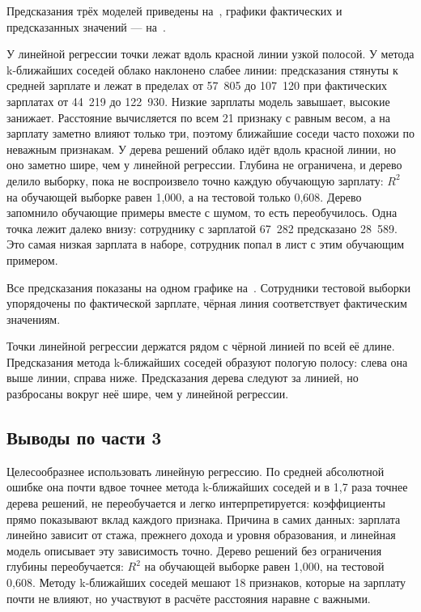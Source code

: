 \documentclass[a4paper,14pt]{extarticle}
\begin{document}
Предсказания трёх моделей приведены на~, графики фактических и предсказанных значений — на~.



У линейной регрессии точки лежат вдоль красной линии узкой полосой. У метода k-ближайших соседей облако наклонено слабее линии: предсказания стянуты к средней зарплате и лежат в пределах от 57~805 до 107~120 при фактических зарплатах от 44~219 до 122~930. Низкие зарплаты модель завышает, высокие занижает. Расстояние вычисляется по всем 21 признаку с равным весом, а на зарплату заметно влияют только три, поэтому ближайшие соседи часто похожи по неважным признакам. У дерева решений облако идёт вдоль красной линии, но оно заметно шире, чем у линейной регрессии. Глубина не ограничена, и дерево делило выборку, пока не воспроизвело точно каждую обучающую зарплату: $R^2$ на обучающей выборке равен 1,000, а на тестовой только 0,608. Дерево запомнило обучающие примеры вместе с шумом, то есть переобучилось. Одна точка лежит далеко внизу: сотруднику с зарплатой 67~282 предсказано 28~589. Это самая низкая зарплата в наборе, сотрудник попал в лист с этим обучающим примером.

Все предсказания показаны на одном графике на~. Сотрудники тестовой выборки упорядочены по фактической зарплате, чёрная линия соответствует фактическим значениям.


Точки линейной регрессии держатся рядом с чёрной линией по всей её длине. Предсказания метода k-ближайших соседей образуют пологую полосу: слева она выше линии, справа ниже. Предсказания дерева следуют за линией, но разбросаны вокруг неё шире, чем у линейной регрессии.

\subsection{Выводы по части 3}

Целесообразнее использовать линейную регрессию. По средней абсолютной ошибке она почти вдвое точнее метода k-ближайших соседей и в 1,7 раза точнее дерева решений, не переобучается и легко интерпретируется: коэффициенты прямо показывают вклад каждого признака. Причина в самих данных: зарплата линейно зависит от стажа, прежнего дохода и уровня образования, и линейная модель описывает эту зависимость точно. Дерево решений без ограничения глубины переобучается: $R^2$ на обучающей выборке равен 1,000, на тестовой 0,608. Методу k-ближайших соседей мешают 18 признаков, которые на зарплату почти не влияют, но участвуют в расчёте расстояния наравне с важными.
\end{document}
